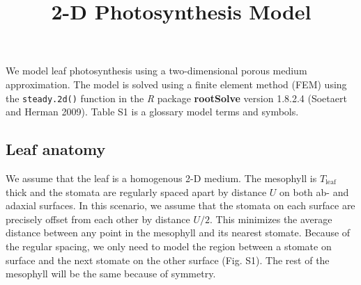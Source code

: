 \documentclass[
  letterpaper,
  DIV=11,
  numbers=noendperiod]{scrartcl}
\title{2-D Photosynthesis Model}
\author{}
\date{}
\begin{document}
\maketitle
\ifdefined\Shaded\renewenvironment{Shaded}{\begin{tcolorbox}[boxrule=0pt, frame hidden, enhanced, sharp corners, borderline west={3pt}{0pt}{shadecolor}, breakable, interior hidden]}{\end{tcolorbox}}\fi

We model leaf photosynthesis using a two-dimensional porous medium
approximation. The model is solved using a finite element method (FEM)
using the \texttt{steady.2d()} function in the \emph{R} package
\textbf{rootSolve} version 1.8.2.4 (Soetaert and Herman 2009). Table S1
is a glossary model terms and symbols.

\hypertarget{leaf-anatomy}{%
\subsection{Leaf anatomy}\label{leaf-anatomy}}

We assume that the leaf is a homogenous 2-D medium. The mesophyll is
\(T_\text{leaf}\) thick and the stomata are regularly spaced apart by
distance \(U\) on both ab- and adaxial surfaces. In this scenario, we
assume that the stomata on each surface are precisely offset from each
other by distance \(U/2\). This minimizes the average distance between
any point in the mesophyll and its nearest stomate. Because of the
regular spacing, we only need to model the region between a stomate on
surface and the next stomate on the other surface (Fig. S1). The rest of
the mesophyll will be the same because of symmetry.
\end{document}
